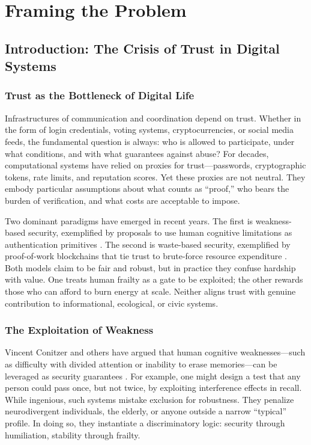 \documentclass{book}
\begin{document}
\part{Framing the Problem}

\chapter{Introduction: The Crisis of Trust in Digital Systems}

\section{Trust as the Bottleneck of Digital Life}

Infrastructures of communication and coordination depend on trust. Whether in the form of login credentials, voting systems, cryptocurrencies, or social media feeds, the fundamental question is always: who is allowed to participate, under what conditions, and with what guarantees against abuse? For decades, computational systems have relied on proxies for trust—passwords, cryptographic tokens, rate limits, and reputation scores. Yet these proxies are not neutral. They embody particular assumptions about what counts as “proof,” who bears the burden of verification, and what costs are acceptable to impose.

Two dominant paradigms have emerged in recent years. The first is weakness-based security, exemplified by proposals to use human cognitive limitations as authentication primitives \cite{conitzer2020}. The second is waste-based security, exemplified by proof-of-work blockchains that tie trust to brute-force resource expenditure \cite{nakamoto2008}. Both models claim to be fair and robust, but in practice they confuse hardship with value. One treats human frailty as a gate to be exploited; the other rewards those who can afford to burn energy at scale. Neither aligns trust with genuine contribution to informational, ecological, or civic systems.

\section{The Exploitation of Weakness}

Vincent Conitzer and others have argued that human cognitive weaknesses—such as difficulty with divided attention or inability to erase memories—can be leveraged as security guarantees \cite{conitzer2020}. For example, one might design a test that any person could pass once, but not twice, by exploiting interference effects in recall. While ingenious, such systems mistake exclusion for robustness. They penalize neurodivergent individuals, the elderly, or anyone outside a narrow “typical” profile. In doing so, they instantiate a discriminatory logic: security through humiliation, stability through frailty.
\end{document}
